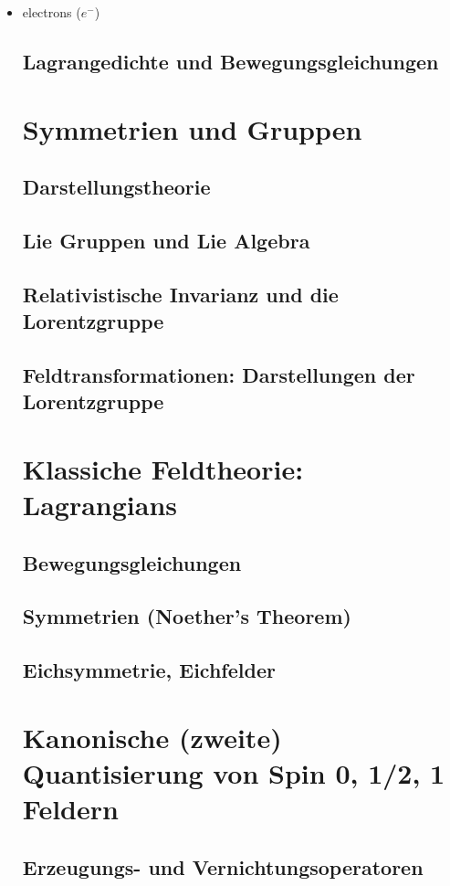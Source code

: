 \documentclass{include/thesisclass}
\begin{document}
\begin{itemize}
\item electrons ($e^-$)

\section{Lagrangedichte und Bewegungsgleichungen}
%

\chapter{Symmetrien und Gruppen}
\section{Darstellungstheorie}
\section{Lie Gruppen und Lie Algebra}
\section{Relativistische Invarianz und die Lorentzgruppe}
\section{Feldtransformationen: Darstellungen der Lorentzgruppe}

\chapter{Klassiche Feldtheorie: Lagrangians}
\section{Bewegungsgleichungen}
\section{Symmetrien (Noether's Theorem)}
\section{Eichsymmetrie, Eichfelder}

\chapter{Kanonische (zweite) Quantisierung von Spin 0, 1/2, 1 Feldern}
\section{Erzeugungs- und Vernichtungsoperatoren}

\end{itemize}
\end{document}
